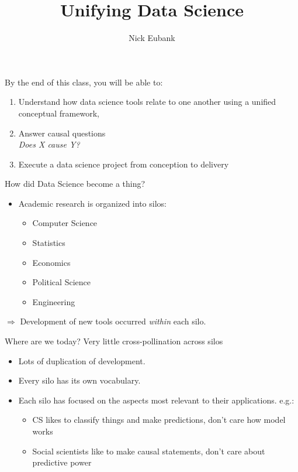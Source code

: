 \documentclass[11pt]{beamer}
\title{Unifying Data Science}
\author{\small Nick Eubank}
\date{\vspace*{.3in} \date}
\begin{document}
\begin{frame}[c]
\maketitle
\end{frame}

\begin{frame}[c]{}
  By the end of this class, you will be able to:
\begin{enumerate}
  \item Understand how data science tools relate to one another using a unified conceptual framework,
  \item Answer causal questions\\
  \emph{Does X cause Y?}
  \item Execute a data science project from conception to delivery
\end{enumerate}
\end{frame}

\begin{frame}[c]{How did Data Science become a thing?}

\begin{itemize}
	\pause \item Academic research is organized into silos:
	\pause
	\begin{itemize}
		\item Computer Science
		\item Statistics
		\item Economics
		\item Political Science
		\item Engineering
	\end{itemize}
\end{itemize}
\pause $\Rightarrow$ Development of new tools occurred \emph{within} each silo.
\end{frame}


\begin{frame}[c]{Where are we today?}
Very little cross-pollination across silos
\begin{itemize}
	\pause \item Lots of duplication of development.
	\pause \item Every silo has its own vocabulary.
	\pause \item Each silo has focused on the aspects most relevant to their applications. e.g.:
	\begin{itemize}
		\pause \item CS likes to classify things and make predictions, don't care how model works
		\item Social scientists like to make causal statements, don't care about predictive power
	\end{itemize}
\end{itemize}
\end{frame}
\end{document}
